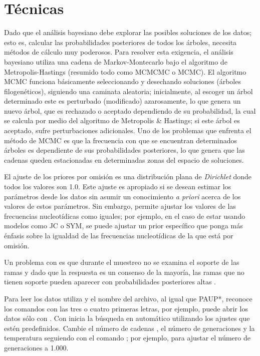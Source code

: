 \section*{T\'ecnicas}
Dado que el an\'alisis bayesiano debe explorar las posibles soluciones de los datos; esto es, calcular las probabilidades posteriores de todos los \'arboles, necesita m\'etodos de c\'alculo muy poderosos. Para resolver esta exigencia, el an\'alisis bayesiano utiliza una cadena de Markov-Montecarlo bajo el algoritmo de Metropolis-Hastings (resumido todo como MCMCMC o MCMC). El algoritmo MCMC funciona b\'asicamente seleccionando y desechando 
soluciones (\'arboles filogen\'eticos), siguiendo una caminata aleatoria; inicialmente, al escoger un \'arbol determinado este es perturbado (modificado) azarosamente, lo que genera un nuevo \'arbol, que es rechazado o aceptado dependiendo de su probabilidad, la cual se calcula por medio del algoritmo de Metropolis \& Hastings; si este \'arbol es aceptado, sufre perturbaciones adicionales. Uno de los problemas que enfrenta el m\'etodo de MCMC es que la frecuencia con que se encuentran  determinados \'arboles es dependiente de sus probabilidades posteriores, lo que genera que las cadenas queden estacionadas en determinadas zonas del espacio de soluciones.

El ajuste de los priores por omisi\'on es una distribuci\'on plana de \textit{Dirichlet} donde todos los valores son 1.0. Este ajuste es apropiado si se desean estimar los par\'ametros desde los datos sin asumir un conocimiento \textit{a priori} acerca de los valores de estos par\'ametros. Sin embargo,   permite ajustar los valores de las frecuencias nucleot\'idicas como iguales; por ejemplo, en el caso de estar usando modelos como JC o SYM, se puede ajustar un prior espec\'ifico que ponga m\'as \'enfasis sobre la igualdad de las frecuencias nucleot\'idicas de la que est\'a por omisi\'on.

Un problema con  es que durante el muestreo no se examina el soporte de las ramas y dado que la respuesta es un consenso de la mayor\'ia, las ramas que no tienen soporte pueden aparecer con probabilidades posteriores altas \citep{Goloboff2005}.


Para leer los datos  utiliza  y el nombre del archivo, al igual que {PAUP*},  reconoce los comandos con las tres o cuatro primeras letras, por ejemplo, puede abrir los datos s\'olo con .
Con   inicia la b\'usqueda en autom\'atico utilizando los ajustes que est\'en predefinidos. Cambie el n\'umero de cadenas , el n\'umero de generaciones  y la temperatura  seguiendo con el comando ;
por ejemplo,  para ajustar el n\'umero de generaciones a 1.000.

